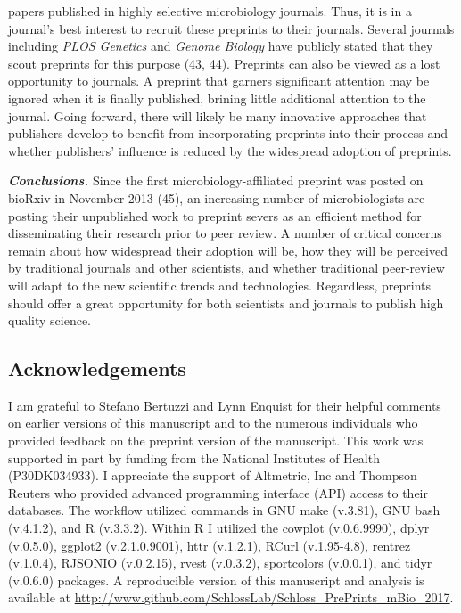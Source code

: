 \documentclass[11pt,]{article}
\begin{document}
papers published in highly selective microbiology journals. Thus, it is
in a journal's best interest to recruit these preprints to their
journals. Several journals including \emph{PLOS Genetics} and
\emph{Genome Biology} have publicly stated that they scout preprints for
this purpose (43, 44). Preprints can also be viewed as a lost
opportunity to journals. A preprint that garners significant attention
may be ignored when it is finally published, brining little additional
attention to the journal. Going forward, there will likely be many
innovative approaches that publishers develop to benefit from
incorporating preprints into their process and whether publishers'
influence is reduced by the widespread adoption of preprints.

\textbf{\emph{Conclusions.}} Since the first microbiology-affiliated
preprint was posted on bioRxiv in November 2013 (45), an increasing
number of microbiologists are posting their unpublished work to preprint
severs as an efficient method for disseminating their research prior to
peer review. A number of critical concerns remain about how widespread
their adoption will be, how they will be perceived by traditional
journals and other scientists, and whether traditional peer-review will
adapt to the new scientific trends and technologies. Regardless,
preprints should offer a great opportunity for both scientists and
journals to publish high quality science.

\subsection{Acknowledgements}\label{acknowledgements}

I am grateful to Stefano Bertuzzi and Lynn Enquist for their helpful
comments on earlier versions of this manuscript and to the numerous
individuals who provided feedback on the preprint version of the
manuscript. This work was supported in part by funding from the National
Institutes of Health (P30DK034933). I appreciate the support of
Altmetric, Inc and Thompson Reuters who provided advanced programming
interface (API) access to their databases. The workflow utilized
commands in GNU make (v.3.81), GNU bash (v.4.1.2), and R (v.3.3.2).
Within R I utilized the cowplot (v.0.6.9990), dplyr (v.0.5.0), ggplot2
(v.2.1.0.9001), httr (v.1.2.1), RCurl (v.1.95-4.8), rentrez (v.1.0.4),
RJSONIO (v.0.2.15), rvest (v.0.3.2), sportcolors (v.0.0.1), and tidyr
(v.0.6.0) packages. A reproducible version of this manuscript and
analysis is available at
\url{http://www.github.com/SchlossLab/Schloss_PrePrints_mBio_2017}.
\end{document}
